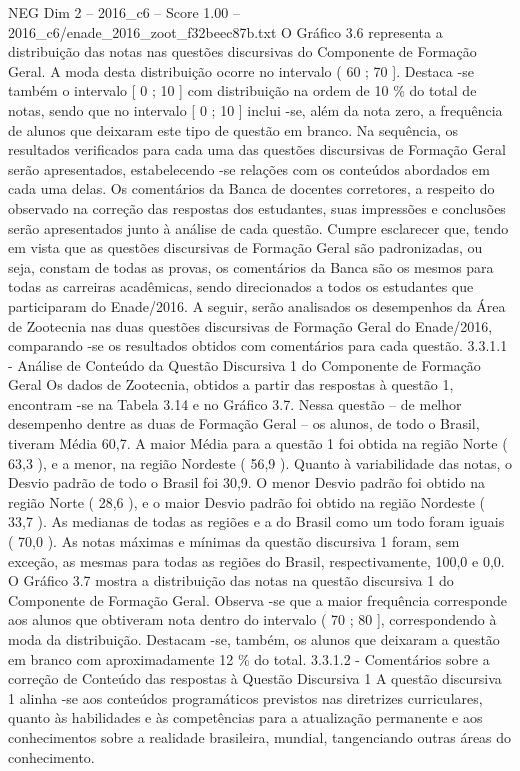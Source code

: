 \begin{textsample}{NEG Dim 2 – 2016\_c6 – Score 1.00 – 2016\_c6/enade\_2016\_zoot\_f32beec87b.txt}
O Gráfico 3.6 representa a distribuição das notas nas questões discursivas do Componente de Formação Geral.
A moda desta distribuição ocorre no intervalo ( 60 ; 70 ].
Destaca -se também o intervalo [ 0 ; 10 ] com distribuição na ordem de 10 \% do total de notas, sendo que no intervalo [ 0 ; 10 ] inclui -se, além da nota zero, a frequência de alunos que deixaram este tipo de questão em branco.
Na sequência, os resultados verificados para cada uma das questões discursivas de Formação Geral serão apresentados, estabelecendo -se relações com os conteúdos abordados em cada uma delas.
Os comentários da Banca de docentes corretores, a respeito do observado na correção das respostas dos estudantes, suas impressões e conclusões serão apresentados junto à análise de cada questão.
Cumpre esclarecer que, tendo em vista que as questões discursivas de Formação Geral são padronizadas, ou seja, constam de todas as provas, os comentários da Banca são os mesmos para todas as carreiras acadêmicas, sendo direcionados a todos os estudantes que participaram do Enade/2016.
A seguir, serão analisados os desempenhos da Área de Zootecnia nas duas questões discursivas de Formação Geral do Enade/2016, comparando -se os resultados obtidos com comentários para cada questão. 3.3.1.1 - Análise de Conteúdo da Questão Discursiva 1 do Componente de Formação Geral Os dados de Zootecnia, obtidos a partir das respostas à questão 1, encontram -se na Tabela 3.14 e no Gráfico 3.7.
Nessa questão – de melhor desempenho dentre as duas de Formação Geral – os alunos, de todo o Brasil, tiveram Média 60,7.
A maior Média para a questão 1 foi obtida na região Norte ( 63,3 ), e a menor, na região Nordeste ( 56,9 ).
Quanto à variabilidade das notas, o Desvio padrão de todo o Brasil foi 30,9.
O menor Desvio padrão foi obtido na região Norte ( 28,6 ), e o maior Desvio padrão foi obtido na região Nordeste ( 33,7 ).
As medianas de todas as regiões e a do Brasil como um todo foram iguais ( 70,0 ).
As notas máximas e mínimas da questão discursiva 1 foram, sem exceção, as mesmas para todas as regiões do Brasil, respectivamente, 100,0 e 0,0.
O Gráfico 3.7 mostra a distribuição das notas na questão discursiva 1 do Componente de Formação Geral.
Observa -se que a maior frequência corresponde aos alunos que obtiveram nota dentro do intervalo ( 70 ; 80 ], correspondendo à moda da distribuição.
Destacam -se, também, os alunos que deixaram a questão em branco com aproximadamente 12 \% do total. 3.3.1.2 - Comentários sobre a correção de Conteúdo das respostas à Questão Discursiva 1 A questão discursiva 1 alinha -se aos conteúdos programáticos previstos nas diretrizes curriculares, quanto às habilidades e às competências para a atualização permanente e aos conhecimentos sobre a realidade brasileira, mundial, tangenciando outras áreas do conhecimento.

\end{textsample}
